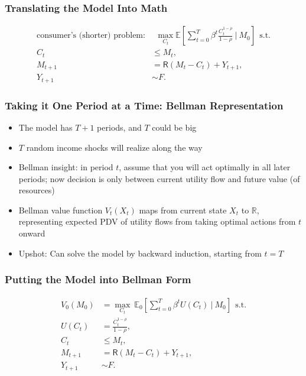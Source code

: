 \documentclass[aspectratio=169]{beamer}
\newcommand{\E}{\mathbb{E}}
\newcommand{\R}{\mathbb{R}}
\begin{document}

\begin{frame}
\frametitle{Translating the Model Into Math}

\begin{align*}
\text{consumer's (shorter) problem:} & ~~ \max_{C_t} \E \left[ \sum_{t=0}^T \beta^t \frac{C_t^{1-\rho}}{1-\rho} ~\bigg|~ M_0 \right] ~~\text{s.t.} \\
C_t &\leq M_t, \\
M_{t+1} &= \mathsf{R} (M_t - C_t) + Y_{t+1}, \\
Y_{t+1} &\sim F.
\end{align*}
\end{frame}



\begin{frame}
\frametitle{Taking it One Period at a Time: Bellman Representation}

\begin{itemize}
	\item The model has $T+1$ periods, and $T$ could be big
	
	\item $T$ random income shocks will realize along the way
	
	\item Bellman insight: in period $t$, assume that you will act optimally in all later periods; now decision is only between current utility flow and future value (of resources)
	
	\item Bellman value function $V_t(X_t)$ maps from current state $X_t$ to $\R$, representing expected PDV of utility flows from taking optimal actions from $t$ onward
	
	\item Upshot: Can solve the model by backward induction, starting from $t=T$
\end{itemize}
\end{frame}


\begin{frame}
\frametitle{Putting the Model into Bellman Form}

\begin{align*}
V_0(M_0) &= \max_{C_t} ~\E_0 \left[ \sum_{t=0}^T \beta^t U(C_t) ~\bigg|~ M_0 \right] ~~\text{s.t.} \\
U(C_t) &= \frac{C_t^{1-\rho}}{1-\rho}, \\
C_t &\leq M_t, \\
M_{t+1} &= \mathsf{R} (M_t - C_t) + Y_{t+1}, \\
Y_{t+1} &\sim F.
\end{align*}
\end{frame}
\end{document}
